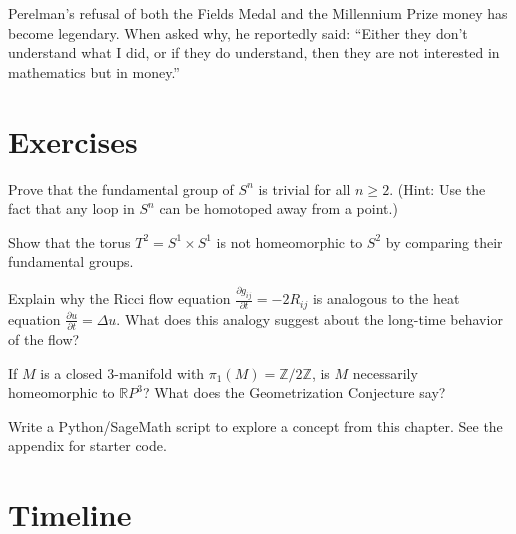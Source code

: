 \begin{historicalbox}
Perelman's refusal of both the Fields Medal and the Millennium Prize money has become legendary. When asked why, he reportedly said: ``Either they don't understand what I did, or if they do understand, then they are not interested in mathematics but in money.''
\end{historicalbox}

\section{Exercises}

\begin{exercise}[Basic]
Prove that the fundamental group of $S^n$ is trivial for all $n \geq 2$. (Hint: Use the fact that any loop in $S^n$ can be homotoped away from a point.)
\end{exercise}

\begin{exercise}[Intermediate]
Show that the torus $T^2 = S^1 \times S^1$ is not homeomorphic to $S^2$ by comparing their fundamental groups.
\end{exercise}

\begin{exercise}[Challenge]
Explain why the Ricci flow equation $\frac{\partial g_{ij}}{\partial t} = -2R_{ij}$ is analogous to the heat equation $\frac{\partial u}{\partial t} = \Delta u$. What does this analogy suggest about the long-time behavior of the flow?
\end{exercise}

\begin{exercise}
If $M$ is a closed 3-manifold with $\pi_1(M) = \mathbb{Z}/2\mathbb{Z}$, is $M$ necessarily homeomorphic to $\mathbb{R}P^3$? What does the Geometrization Conjecture say?
\end{exercise}


\begin{exercise}[Computational]
Write a Python/SageMath script to explore a concept from this chapter. See the appendix for starter code.
\end{exercise}

\section{Timeline}

